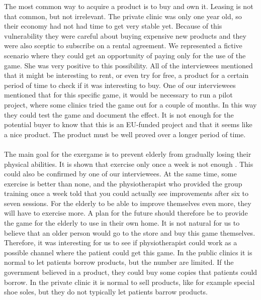 The most common way to acquire a product is to buy and own it. Leasing is not that common, but not irrelevant. The private clinic was only one year old, so their economy had not had time to get very stable yet. Because of this vulnerability they were careful about buying expensive new products and they were also sceptic to subscribe on a rental agreement. We represented a fictive scenario where they could get an opportunity of paying only for the use of the game. She was very positive to this possibility. All of the interviewees mentioned that it might be interesting to rent, or even try for free, a product for a certain period of time to check if it was interesting to buy.  One of our interviewees mentioned that for this specific game, it would be necessary to run a pilot project, where some clinics tried the game out for a couple of months. In this way they could test the game and document the effect. It is not enough for the potential buyer to know that this is an EU-funded project and that it seems like a nice product. The product must be well proved over a longer period of time. \\ \\
The main goal for the exergame is to prevent elderly from gradually losing their physical abilities. It is shown that exercise only once a week is not enough \cite{gruppetrening-trheim}. This could also be confirmed by one of our interviewees. At the same time, some exercise is better than none, and the physiotherapist who provided the group training once a week told that you could actually see improvements after six to seven sessions. For the elderly to be able to improve themselves even more, they will have to exercise more. A plan for the future should therefore be to provide the game for the elderly to use in their own home. It is not natural for us to believe that an older person would go to the store and buy this game themselves. Therefore, it was interesting for us to see if physiotherapist could work as a possible channel where the patient could get this game. In the public clinics it is normal to let patients borrow products, but the number are limited.  If the government believed in a product, they could buy some copies that patients could borrow. In the private clinic it is normal to sell products, like for example special shoe soles, but they do not typically let patients barrow products. \\ \\
